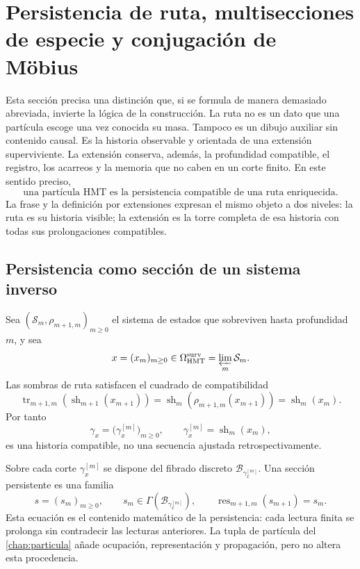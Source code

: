 \section{Persistencia de ruta, multisecciones de especie y conjugaci\'on de M\"obius}
\label{sec:persistencia-ruta-mobius-familias}

Esta secci\'on precisa una distinci\'on que, si se formula de manera demasiado
abreviada, invierte la l\'ogica de la construcci\'on. La ruta no es un dato que
una part\'icula escoge una vez conocida su masa. Tampoco es un dibujo auxiliar
sin contenido causal. Es la historia observable y orientada de una extensi\'on
superviviente. La extensi\'on conserva, adem\'as, la profundidad compatible, el
registro, los acarreos y la memoria que no caben en un corte finito. En este
sentido preciso,
\[
 \boxed{\text{una part\'icula HMT es la persistencia compatible de una ruta
 enriquecida}.}
\]
La frase y la definici\'on por extensiones expresan el mismo objeto a dos
niveles: la ruta es su historia visible; la extensi\'on es la torre completa de
esa historia con todas sus prolongaciones compatibles.

\subsection{Persistencia como secci\'on de un sistema inverso}

Sea \((\mathcal S_m,\rho_{m+1,m})_{m\geq0}\) el sistema de estados que
sobreviven hasta profundidad \(m\), y sea
\[
 x=(x_m)_{m\geq0}\in\Omega_{\rm HMT}^{\rm surv}
 =\varprojlim_m\mathcal S_m.
\]
Las sombras de ruta satisfacen el cuadrado de compatibilidad
\[
 \operatorname{tr}_{m+1,m}\!\left(\operatorname{sh}_{m+1}(x_{m+1})\right)
 =\operatorname{sh}_{m}\!\left(\rho_{m+1,m}(x_{m+1})\right)
 =\operatorname{sh}_{m}(x_m).
\]
Por tanto
\[
 \gamma_x=\bigl(\gamma_x^{[m]}\bigr)_{m\geq0},
 \qquad \gamma_x^{[m]}=\operatorname{sh}_m(x_m),
\]
es una historia compatible, no una secuencia ajustada retrospectivamente.

Sobre cada corte \(\gamma_x^{[m]}\) se dispone del fibrado discreto
\(\mathcal B_{\gamma_x^{[m]}}\). Una secci\'on persistente es una familia
\[
 s=(s_m)_{m\geq0},
 \qquad
 s_m\in\Gamma\!\left(\mathcal B_{\gamma_x^{[m]}}\right),
 \qquad
 \operatorname{res}_{m+1,m}(s_{m+1})=s_m.
\]
Esta ecuaci\'on es el contenido matem\'atico de la persistencia: cada lectura
finita se prolonga sin contradecir las lecturas anteriores. La tupla de
part\'icula del \cref{chap:particula} a\~nade ocupaci\'on,
representaci\'on y propagaci\'on, pero no altera esta procedencia.

